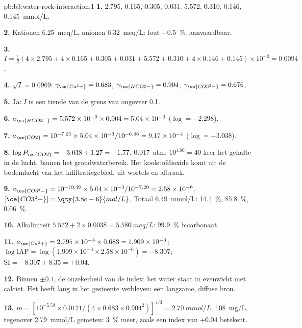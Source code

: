 \begin{solution}{pb:b3:water-rock-interaction:1}
\textbf{1.}  2.795,  0.165,  0.305,  0.031,
 5.572,  0.310,  0.146,  \qty{0.145}{mmol/L}.

\textbf{2.} Kationen \qty{6.25}{meq/L}, anionen \qty{6.32}{meq/L}: fout
\qty{-0.5}{\percent}, aanvaardbaar.

\textbf{3.} $I = \tfrac12(4\times2.795 + 4\times0.165 + 0.305 + 0.031 + 5.572
+ 0.310 + 4\times0.146 + 0.145)\times10^{-3} = 0.0094$.

\textbf{4.} $\sqrt I = 0.0969$: $\gamma_{\ce{Ca^2+}} = 0.683$,
$\gamma_{\ce{HCO3-}} = 0.904$, $\gamma_{\ce{CO3^2-}} = 0.676$.

\textbf{5.} Ja: $I$ is een tiende van de grens van ongeveer 0.1.

\textbf{6.} $a_{\ce{HCO3-}} = 5.572\times10^{-3}\times0.904 = 5.04\times
10^{-3}$ ($\log = -2.298$).

\textbf{7.} $a_{\ce{CO2}} = 10^{-7.20}\times5.04\times10^{-3}/10^{-6.46} =
9.17\times10^{-4}$ ($\log = -3.038$).

\textbf{8.} $\log P_{\ce{CO2}} = -3.038 + 1.27 = -1.77$, \qty{0.017}{atm}:
$10^{1.60} = 40$ keer het gehalte in de lucht, binnen het grondwaterbereik. Het
koolstofdioxide komt uit de bodemlucht van het infiltratiegebied, uit wortels en afbraak.

\textbf{9.} $a_{\ce{CO3^2-}} = 10^{-10.49}\times5.04\times10^{-3}/10^{-7.20}
= 2.58\times10^{-6}$, $[\ce{CO3^2-}] = \qty{3.8e-6}{mol/L}$. Totaal
\qty{6.49}{mmol/L}:  \qty{14.1}{\percent}, 
\qty{85.8}{\percent},  \qty{0.06}{\percent}.

\textbf{10.} Alkaliniteit $5.572 + 2\times0.0038 = \qty{5.580}{meq/L}$:
\qty{99.9}{\percent} bicarbonaat.

\textbf{11.} $a_{\ce{Ca^2+}} = 2.795\times10^{-3}\times0.683 = 1.909\times
10^{-3}$; $\log\mathrm{IAP} = \log(1.909\times10^{-3}\times2.58\times10^{-6})
= -8.307$; $\mathrm{SI} = -8.307 + 8.35 = +0.04$.

\textbf{12.} Binnen $\pm0.1$, de onzekerheid van de index: het water staat in
evenwicht met calciet. Het heeft lang in het gesteente verbleven: een langzame, diffuse
bron.

\textbf{13.} $m = [10^{-5.59}\times0.0171/(4\times0.683\times0.904^2)]^{1/3}
= \qty{2.70}{mmol/L}$, \qty{108}{mg/L}, tegenover \qty{2.79}{mmol/L} gemeten:
\qty{3}{\percent} meer, zoals een index van $+0.04$ betekent.


\end{solution}
